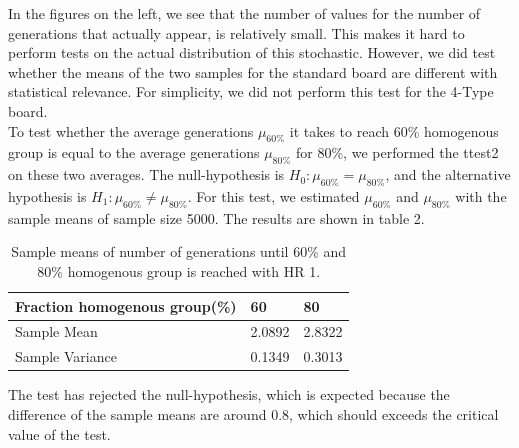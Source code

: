 In the figures on the left, we see that the number of values for the number of generations that actually appear, is relatively small. This makes it hard to perform tests on the actual distribution of this stochastic. However, we did test whether the means of the two samples for the standard board are different with statistical relevance. For simplicity, we did not perform this test for the 4-Type board.\\
To test whether the average generations $\mu_{60\%}$ it takes to reach 60\% homogenous group is equal to the average generations $\mu_{80\%}$ for 80\%, we performed the ttest2 on these two averages. The null-hypothesis is $H_0:\mu_{60\%}=\mu_{80\%}$, and the alternative hypothesis is $H_1: \mu_{60\%}\neq \mu_{80\%}$. For this test, we estimated $\mu_{60\%}$ and $\mu_{80\%}$ with the sample means of sample size 5000. The results are shown in table 2.
\begin{table}[htp]
\centering
\caption{Sample means of number of generations until 60\% and 80\% homogenous group is reached with HR 1.}
\begin{tabular}{|l|l|l|}
\hline
 Fraction homogenous group(\%)&60&80 \\ \hline
 Sample Mean&2.0892&2.8322  \\
 Sample Variance & 0.1349 & 0.3013\\ \hline 
\end{tabular}
\end{table}
The test has rejected the null-hypothesis, which is expected because the difference of the sample means are around 0.8, which should exceeds the critical value of the test.\\


